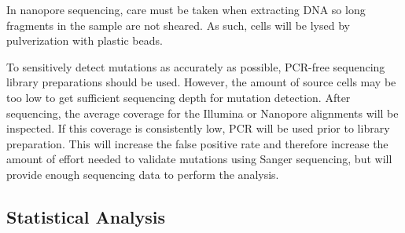 


In nanopore sequencing, care must be taken when extracting DNA so long fragments in the sample are not sheared. As such, cells will be lysed by pulverization with plastic beads. 









To sensitively detect mutations as accurately as possible, PCR-free sequencing library preparations should be used. However, the amount of source cells may be too low to get sufficient sequencing depth for mutation detection. After sequencing, the average coverage for the Illumina or Nanopore alignments will be inspected. If this coverage is consistently low, PCR will be used prior to library preparation. This will increase the false positive rate and therefore increase the amount of effort needed to validate mutations using Sanger sequencing, but will provide enough sequencing data to perform the analysis.


\subsection{Statistical Analysis}



\clearpage

\printbibliography

